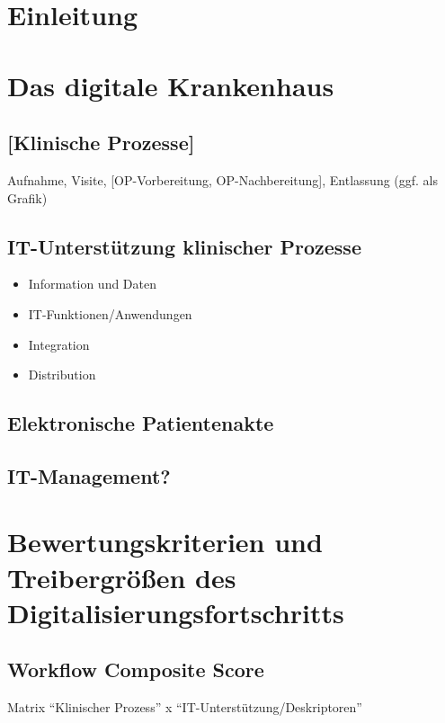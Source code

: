 
{}
\section{Einleitung}
\section{Das digitale Krankenhaus}
	\subsection{[Klinische Prozesse]}
		Aufnahme, Visite, [OP-Vorbereitung, OP-Nachbereitung], Entlassung (ggf. als Grafik)
	\subsection{IT-Unterstützung klinischer Prozesse}
		\parencite[37]{huebner2019}
	\begin{itemize} 
		\item Information und Daten
		\item IT-Funktionen/Anwendungen
		\item Integration
		\item Distribution
	\end{itemize}
	\subsection{ Elektronische Patientenakte}
	\subsection{IT-Management?}
\section{Bewertungskriterien und Treibergrößen des Digitalisierungsfortschritts}
	\subsection{Workflow Composite Score}
		Matrix “Klinischer Prozess” x “IT-Unterstützung/Deskriptoren”
